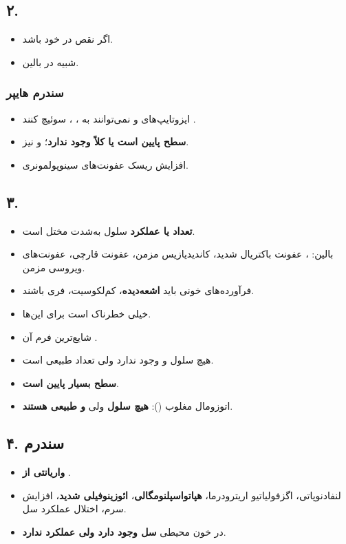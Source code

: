 \documentclass[12pt,a4paper]{article}
\begin{document}
\subsection*{۲. }
\begin{itemize}
\item اگر نقص در خود  باشد.
\item شبیه  در بالین.
\end{itemize}

\subsubsection*{سندرم هایپر }
\begin{itemize}
\item ایزوتایپ‌های  و  نمی‌توانند به ، ، 
سوئیچ کنند \LDarrow{} \textbf{}.
\item \textbf{سطح  پایین است یا کلاً وجود ندارد}؛  و  نیز.
\item افزایش ریسک عفونت‌های سینوپولمونری.
\end{itemize}

\subsection*{۳. }
\begin{itemize}
\item \textbf{تعداد یا عملکرد} سلول  به‌شدت مختل است.
\item بالین: ، عفونت باکتریال شدید، کاندیدیازیس مزمن، عفونت قارچی،
عفونت‌های ویروسی مزمن.
\item فرآورده‌های خونی باید \textbf{اشعه‌دیده}، کم‌لکوسیت،  فری باشند.
\item {} خیلی خطرناک است برای این‌ها.
\item شایع‌ترین فرم آن \textbf{}.
\item هیچ سلول  و  وجود ندارد ولی تعداد  طبیعی است.
\item \textbf{سطح  بسیار پایین است}.
\item {} اتوزومال مغلوب ():
\textbf{هیچ سلول } ولی \textbf{ و  طبیعی هستند}.
\end{itemize}

\subsection*{۴. سندرم }
\begin{itemize}
\item \textbf{واریانتی از }.
\item لنفادنوپاتی، اگزفولیاتیو اریترودرما، \textbf{هپاتواسپلنومگالی}،
\textbf{ائوزینوفیلی شدید}، افزایش  سرم، اختلال عملکرد  سل.
\item در خون محیطی \textbf{ سل وجود دارد ولی عملکرد ندارد}.
\end{itemize}
\end{document}
